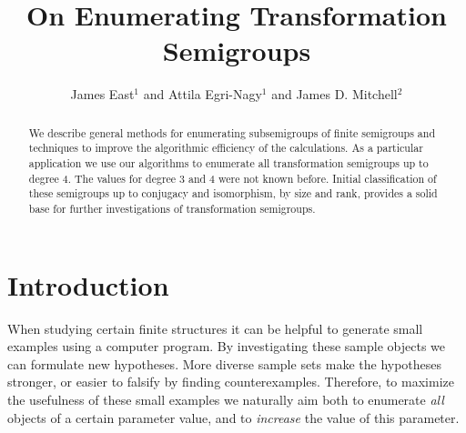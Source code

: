 \documentclass{amsart}
\theoremstyle{plain}
\theoremstyle{definition}
\begin{document}
\title{On Enumerating Transformation Semigroups}
\author[J. East, A. Egri-Nagy, J.D. Mitchell]{James East$^1$ and Attila Egri-Nagy$^{1}$ and James D. Mitchell$^2$}
\address{$^1$Centre for Research in Mathematics, School of Computing, Engineering and Mathematics, University of Western Sydney (Parramatta Campus), Locked Bag 1797, Penrith, NSW 2751, Australia}
\address{$^2$ Mathematical Institute, University of St Andrews, North Haugh, St Andrews, Fife, KY16 9SS, Scotland}
\maketitle
\begin{abstract}
We describe general methods for enumerating subsemigroups of finite semigroups and techniques to improve the algorithmic efficiency of the calculations.
As a particular application we use our algorithms to enumerate all transformation semigroups up to degree 4.
The values for degree 3 and 4 were not known before.
Initial classification of these semigroups up to conjugacy and isomorphism, by
size and rank, provides a solid base for further investigations of
transformation semigroups.
\end{abstract}

\section{Introduction}
When studying certain finite structures it can be helpful to generate small
examples using a computer program.
By investigating these sample objects we can formulate new hypotheses.
More diverse sample sets make the hypotheses stronger, or easier to falsify by finding counterexamples.
Therefore, to maximize the usefulness of these small examples we naturally aim both to enumerate \emph{all} objects of a certain
parameter value, and to \emph{increase} the value of this parameter.
\end{document}

